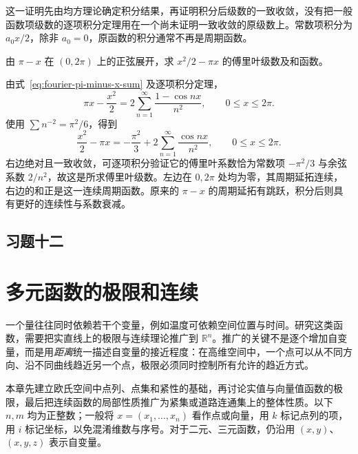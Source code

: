 \documentclass[UTF8,12pt,a4paper,fontset=fandol]{ctexbook}
\begin{document}
这一证明先由均方理论确定积分结果，再证明积分后级数的一致收敛，没有把一般函数项级数的逐项积分定理用在一个尚未证明一致收敛的原级数上。常数项积分为 $a_0x/2$，除非 $a_0=0$，原函数的积分通常不再是周期函数。

\begin{example}
\label{ex:fourier-integrated-sawtooth}
由 $\pi-x$ 在 $(0,2\pi)$ 上的正弦展开，求 $x^2/2-\pi x$ 的傅里叶级数及和函数。
\end{example}

\begin{solve}
由式~\eqref{eq:fourier-pi-minus-x-sum} 及逐项积分定理，
\[
    \pi x-\frac{x^2}{2}
       =2\sum_{n=1}^\infty\frac{1-\cos nx}{n^2},
       \qquad 0\leq x\leq2\pi.
\]
使用 $\sum n^{-2}=\pi^2/6$，得到
\begin{equation}
    \frac{x^2}{2}-\pi x
       =-\frac{\pi^2}{3}
           +2\sum_{n=1}^\infty\frac{\cos nx}{n^2},
       \qquad 0\leq x\leq2\pi.
    \label{eq:fourier-integrated-sawtooth}
\end{equation}
右边绝对且一致收敛，可逐项积分验证它的傅里叶系数恰为常数项 $-\pi^2/3$ 与余弦系数 $2/n^2$，故这是所求傅里叶级数。左边在 $0,2\pi$ 处均为零，其周期延拓连续，右边的和正是这一连续周期函数。原来的 $\pi-x$ 的周期延拓有跳跃，积分后则具有更好的连续性与系数衰减。
\end{solve}

\section*{习题十二}

\chapter{多元函数的极限和连续}
\label{chap:multivariable-limits-and-continuity}


一个量往往同时依赖若干个变量，例如温度可依赖空间位置与时间。研究这类函数，需要把实直线上的极限与连续理论推广到 $\mathbb R^n$。推广的关键不是逐个增加自变量，而是用\emph{距离}统一描述自变量的接近程度：在高维空间中，一个点可以从不同方向、沿不同曲线趋近另一个点，极限必须同时控制所有允许的趋近方式。

本章先建立欧氏空间中点列、点集和紧性的基础，再讨论实值与向量值函数的极限，最后把连续函数的局部性质推广为紧集或道路连通集上的整体性质。以下 $n,m$ 均为正整数；一般将 $x=(x_1,\ldots,x_n)$ 看作点或向量，用 $k$ 标记点列的项，用 $i$ 标记坐标，以免混淆维数与序号。对于二元、三元函数，仍沿用 $(x,y)$、$(x,y,z)$ 表示自变量。
\end{document}
